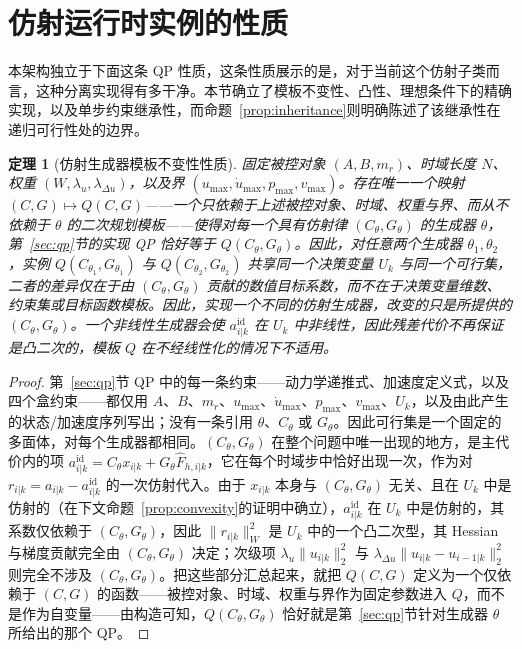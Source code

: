\documentclass[journal]{IEEEtran}
\newtheorem{theorem}{定理}
\begin{document}
\section{仿射运行时实例的性质}
\label{sec:properties}

本架构独立于下面这条 QP 性质，这条性质展示的是，对于当前这个仿射子类而言，这种分离实现得有多干净。本节确立了模板不变性、凸性、理想条件下的精确实现，以及单步约束继承性，而命题~\ref{prop:inheritance}则明确陈述了该继承性在递归可行性处的边界。

\begin{theorem}[仿射生成器模板不变性性质]
\label{thm:invariance}
固定被控对象 $(A,B,m_r)$、时域长度 $N$、权重 $(W,\lambda_u,\lambda_{\Delta u})$，以及界 $(u_{\max},\dot u_{\max},p_{\max},v_{\max})$。存在唯一一个映射 $(C,G)\mapsto Q(C,G)$——一个只依赖于上述被控对象、时域、权重与界、而从不依赖于 $\theta$ 的二次规划模板——使得对每一个具有仿射律 $(C_\theta,G_\theta)$ 的生成器 $\theta$，第~\ref{sec:qp}节的实现 QP 恰好等于 $Q(C_\theta,G_\theta)$。因此，对任意两个生成器 $\theta_1,\theta_2$，实例 $Q(C_{\theta_1},G_{\theta_1})$ 与 $Q(C_{\theta_2},G_{\theta_2})$ 共享同一个决策变量 $U_k$ 与同一个可行集，二者的差异仅在于由 $(C_\theta,G_\theta)$ 贡献的数值目标系数，而不在于决策变量维数、约束集或目标函数模板。因此，实现一个不同的仿射生成器，改变的只是所提供的 $(C_\theta,G_\theta)$。一个非线性生成器会使 $a_{i|k}^{\mathrm{id}}$ 在 $U_k$ 中非线性，因此残差代价不再保证是凸二次的，模板 $Q$ 在不经线性化的情况下不适用。
\end{theorem}

\begin{proof}
第~\ref{sec:qp}节 QP 中的每一条约束——动力学递推式、加速度定义式，以及四个盒约束——都仅用 $A$、$B$、$m_r$、$u_{\max}$、$\dot u_{\max}$、$p_{\max}$、$v_{\max}$、$U_k$，以及由此产生的状态/加速度序列写出；没有一条引用 $\theta$、$C_\theta$ 或 $G_\theta$。因此可行集是一个固定的多面体，对每个生成器都相同。$(C_\theta,G_\theta)$ 在整个问题中唯一出现的地方，是主代价内的项 $a_{i|k}^{\mathrm{id}}=C_\theta x_{i|k}+G_\theta\hat F_{h,i|k}$，它在每个时域步中恰好出现一次，作为对 $r_{i|k}=a_{i|k}-a_{i|k}^{\mathrm{id}}$ 的一次仿射代入。由于 $x_{i|k}$ 本身与 $(C_\theta,G_\theta)$ 无关、且在 $U_k$ 中是仿射的（在下文命题~\ref{prop:convexity}的证明中确立），$a_{i|k}^{\mathrm{id}}$ 在 $U_k$ 中是仿射的，其系数仅依赖于 $(C_\theta,G_\theta)$，因此 $\|r_{i|k}\|_W^2$ 是 $U_k$ 中的一个凸二次型，其 Hessian 与梯度贡献完全由 $(C_\theta,G_\theta)$ 决定；次级项 $\lambda_u\|u_{i|k}\|_2^2$ 与 $\lambda_{\Delta u}\|u_{i|k}-u_{i-1|k}\|_2^2$ 则完全不涉及 $(C_\theta,G_\theta)$。把这些部分汇总起来，就把 $Q(C,G)$ 定义为一个仅依赖于 $(C,G)$ 的函数——被控对象、时域、权重与界作为固定参数进入 $Q$，而不是作为自变量——由构造可知，$Q(C_\theta,G_\theta)$ 恰好就是第~\ref{sec:qp}节针对生成器 $\theta$ 所给出的那个 QP。
\end{proof}
\end{document}
